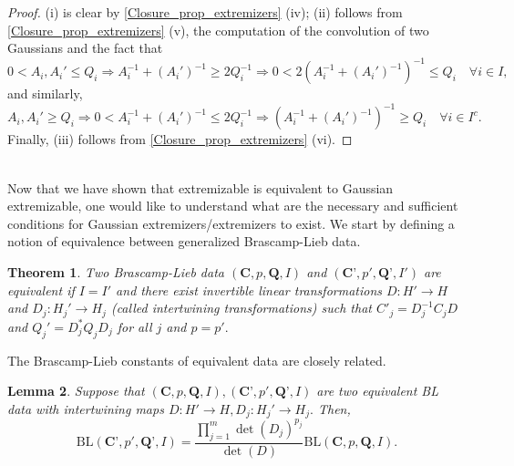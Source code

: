 \documentclass[11pt,a4paper,reqno]{amsart}
\numberwithin{equation}{section}
\newtheorem{theorem}{Theorem}[section]
\newtheorem{lemma}[theorem]{Lemma}
\theoremstyle{definition}
\newcommand{\<}{\ensuremath \leq}
\renewcommand{\>}{\ensuremath \geq}
\begin{document}
\begin{proof}
    (i) is clear by \cref{Closure_prop_extremizers} (iv); (ii) follows from \cref{Closure_prop_extremizers} (v), the computation of the convolution of two Gaussians and the fact that $$0<A_i,A_i' \leq Q_i \Longrightarrow A_i^{-1}+(A_i')^{-1} \geq 2Q_i^{-1} \Longrightarrow 0<2(A_i^{-1}+(A_i')^{-1})^{-1} \leq Q_i \quad \forall i \in I,$$ and similarly, $$A_i,A_i' \ge Q_i \Longrightarrow 0< A_i^{-1}+(A_i')^{-1} \le 2Q_i^{-1} \Longrightarrow (A_i^{-1}+(A_i')^{-1})^{-1} \ge Q_i \quad \forall i \in I^c.$$ Finally, (iii) follows from \cref{Closure_prop_extremizers} (vi).   
\end{proof}

\hfill \\




Now that we have shown that extremizable is equivalent to Gaussian extremizable, one would like to understand what are the necessary and sufficient conditions for Gaussian extremizers/extremizers to exist. 
We start by defining a notion of equivalence between generalized Brascamp-Lieb data. 

\begin{theorem}
    Two Brascamp-Lieb data $(\textbf{C},p,\textbf{Q},I)$ and $(\textbf{C'},p',\textbf{Q'},I')$ are equivalent if $I=I'$ and there exist invertible linear transformations $D: H' \rightarrow H$ and $D_j: H_j' \rightarrow H_j$ (called intertwining transformations) such that $C'_j=D_j^{-1}C_jD$ and $Q_j'=D_j^{*}Q_jD_j$ for all $j$ and $p=p'.$ 
\end{theorem}

The Brascamp-Lieb constants of equivalent data are closely related.

\begin{lemma} \label{Equiv_BL_Constants}
    Suppose that $(\textbf{C},p,\textbf{Q},I), (\textbf{C'},p',\textbf{Q'},I)$ are two equivalent BL data with intertwining maps $D: H' \rightarrow H, D_j: H_j' \rightarrow H_j.$ Then, $$\mathrm{BL}(\textbf{C'},p',\textbf{Q'},I)=\frac{\prod_{j=1}^m \det(D_j)^{p_j}}{\det(D)}\mathrm{BL}(\textbf{C},p,\textbf{Q},I).$$
\end{lemma}
\end{document}
